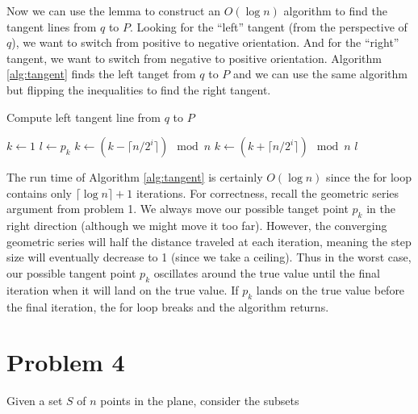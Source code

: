 \documentclass[11pt]{article}
\begin{document}
Now we can use the lemma to construct an $O(\log n)$ algorithm to find the tangent lines from $q$ to $P$.
Looking for the ``left'' tangent (from the perspective of $q$), we want to switch from positive to negative orientation.
And for the ``right'' tangent, we want to switch from negative to positive orientation.
Algorithm \ref{alg:tangent} finds the left tanget from $q$ to $P$ and we can use the same algorithm but flipping the inequalities to find the right tangent.

\begin{algorithm}
    \caption{Compute left tangent line from $q$ to $P$}
    \label{alg:tangent}
    \begin{algorithmic}[1]
        \State $k \gets 1$
                \State $l \gets p_k$
            \EndIf
                \State $k \gets (k - \lceil n/2^i \rceil) \mod n$
            \EndIf
                \State $k \gets (k + \lceil n/2^i \rceil) \mod n$
            \EndIf
        \EndFor
        \State \Return $l$
    \EndFunction
    \end{algorithmic}
\end{algorithm}

The run time of Algorithm \ref{alg:tangent} is certainly $O(\log n)$ since the for loop contains only $\lceil \log n \rceil + 1$ iterations.
For correctness, recall the geometric series argument from problem 1.
We always move our possible tanget point $p_k$ in the right direction (although we might move it too far).
However, the converging geometric series will half the distance traveled at each iteration, meaning the step size will eventually decrease to 1 (since we take a ceiling).
Thus in the worst case, our possible tangent point $p_k$ oscillates around the true value until the final iteration when it will land on the true value.
If $p_k$ lands on the true value before the final iteration, the for loop breaks and the algorithm returns.

\newpage
\section*{Problem 4}

Given a set $S$ of $n$ points in the plane, consider the subsets
\end{document}
